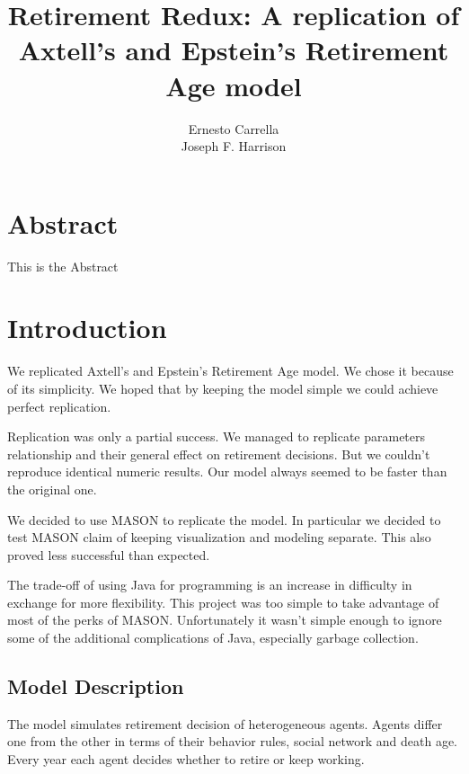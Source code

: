 \documentclass[runningheads,a4paper]{article}
\newcommand{\doctitle}[0]{Retirement Redux: A replication of Axtell's and Epstein's Retirement Age model}
\begin{document}
\title{\doctitle}
\author{Ernesto Carrella \\ Joseph F. Harrison}

\maketitle

\section*{Abstract}
This is the Abstract
\section{Introduction}
\label{sec:intro}

We replicated Axtell's and Epstein's Retirement Age model\cite{axtell_coordination_2006}.
We chose it because of its simplicity.
We hoped that by keeping the model simple we could achieve perfect replication.

Replication was only a partial success.
We managed to replicate parameters relationship and their general effect on retirement decisions.
But we couldn't reproduce identical numeric results.
Our model always seemed to be faster than the original one.

We decided to use MASON to replicate the model.
In particular we decided to test MASON claim of keeping visualization and modeling separate.
This also proved less successful than expected.

The trade-off of using Java for programming is an increase in difficulty in exchange for more flexibility.
This project was too simple to take advantage of most of the perks of MASON.
Unfortunately it wasn't simple enough to ignore some of the additional complications of Java, especially garbage collection.

\subsection{Model Description}

The model simulates retirement decision of heterogeneous agents.
Agents differ one from the other in terms of their behavior rules, social network and death age.
Every year each agent decides whether to retire or keep working. 
\end{document}
